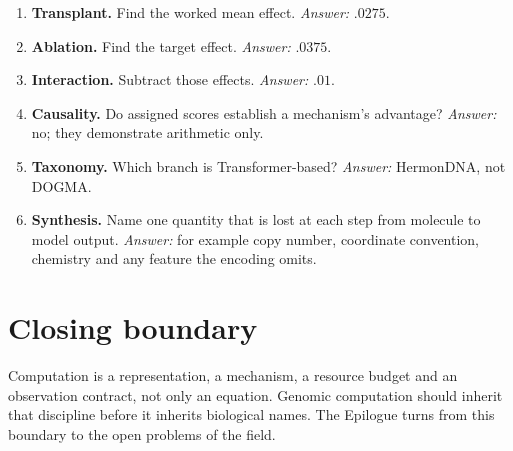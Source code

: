 \begin{enumerate}
\emph{Answer:} not without population, inheritance, variation and selection.
\item \textbf{Transplant.} Find the worked mean effect. \emph{Answer:} $.0275$.
\item \textbf{Ablation.} Find the target effect. \emph{Answer:} $.0375$.
\item \textbf{Interaction.} Subtract those effects. \emph{Answer:} $.01$.
\item \textbf{Causality.} Do assigned scores establish a mechanism's advantage?
\emph{Answer:} no; they demonstrate arithmetic only.
\item \textbf{Taxonomy.} Which branch is Transformer-based?
\emph{Answer:} HermonDNA, not DOGMA.
\item \textbf{Synthesis.} Name one quantity that is lost at each step from molecule
to model output. \emph{Answer:} for example copy number, coordinate convention,
chemistry and any feature the encoding omits.
\end{enumerate}

\section{Closing boundary}
Computation is a representation, a mechanism, a resource budget and an
observation contract, not only an equation. Genomic computation should inherit
that discipline before it inherits biological names. The Epilogue turns from
this boundary to the open problems of the field.
